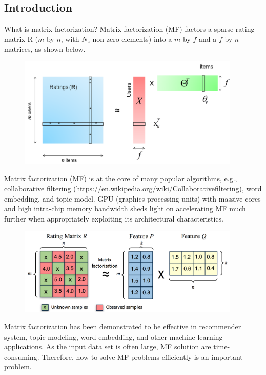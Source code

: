 \documentclass[12pt]{article}
\theoremstyle{remark}
\begin{document}
\begin{CJK}{UTF8}{bsmi}
 \section{Introduction}
What is matrix factorization?
Matrix factorization (MF) factors a sparse rating matrix R ($m$ by $n$, with $N_z$ non-zero elements) into a $m$-by-$f$ and a $f$-by-$n$ matrices, as shown below.
 \begin{figure}[H]
    \begin{center}
        \includegraphics[width=300pt]{1-1.png}
        \label{fig:arch_02}
    \end{center}
\end{figure}
Matrix factorization (MF) is at the core of many popular algorithms, e.g., collaborative filtering (https://en.wikipedia.org/wiki/Collaborativefiltering), word embedding, and topic model. GPU (graphics processing units) with massive cores and high intra-chip memory bandwidth sheds light on accelerating MF much further when appropriately exploiting its architectural characteristics.
 \begin{figure}[H]
    \begin{center}
        \includegraphics[width=300pt]{1-2.png}
        \label{fig:arch_02}
    \end{center}
\end{figure}
Matrix factorization has been demonstrated to be effective in recommender system, topic modeling, word embedding, and other machine learning applications. As the input data set is often large, MF solution are time-consuming. Therefore, how to solve MF problems efficiently is an important problem. \\

\end{CJK}
\end{document}
